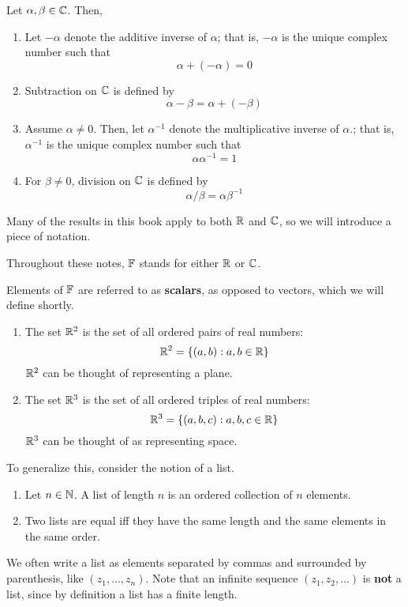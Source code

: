 \begin{definition}
    Let $\alpha,\beta\in\mathbb{C}$. Then,
    \begin{enumerate}
        \item Let $-\alpha$ denote the additive inverse of $\alpha$; that is, $-\alpha$ is the unique complex number such that
        \[ \alpha + (-\alpha) = 0\]
        \item Subtraction on $\mathbb{C}$ is defined by
        \[ \alpha - \beta = \alpha + (-\beta) \]
        \item Assume $\alpha\ne 0$. Then, let $\alpha^{-1}$ denote the multiplicative inverse of $\alpha$.; that is, $\alpha^{-1}$ is the unique complex number such that
        \[ \alpha\alpha^{-1} = 1\]
        \item For $\beta\ne 0$, division on $\mathbb{C}$ is defined by
        \[ \alpha/\beta = \alpha\beta^{-1}\]
    \end{enumerate}
\end{definition}
Many of the results in this book apply to both $\mathbb{R}$ and $\mathbb{C}$, so we will introduce a piece of notation. 

Throughout these notes, $\mathbb F$ stands for either $\mathbb{R}$ or $\mathbb{C}$.

Elements of $\mathbb F$ are referred to as \textbf{scalars}, as opposed to vectors, which we will define shortly.

\begin{example}[$\R^2$, $\R^3$]
    \begin{enumerate}
        \item The set $\R^2$ is the set of all ordered pairs of real numbers:
        \[ \mathbb{R}^2 = \{(a,b) : a,b\in \mathbb{R}\}\]
        $\R^2$ can be thought of representing a plane.
        \item The set $\R^3$ is the set of all ordered triples of real numbers:
        \[ \mathbb{R}^3 = \{(a,b,c) : a,b,c\in\mathbb{R}\} \]
        $\R^3$ can be thought of as representing space.
    \end{enumerate}
\end{example}
To generalize this, consider the notion of a list.
\begin{definition}
    \begin{enumerate}
        \item Let $n\in\mathbb{N}$. A list of length $n$ is an ordered collection of $n$ elements.
        \item Two lists are equal iff they have the same length and the same elements in the same order. 
    \end{enumerate}
\end{definition}
We often write a list as elements separated by commas and surrounded by parenthesis, like $(z_1, \dots, z_n)$. Note that an infinite sequence $(z_1, z_2, \dots)$ is \textbf{not} a list, since by definition a list has a finite length.

